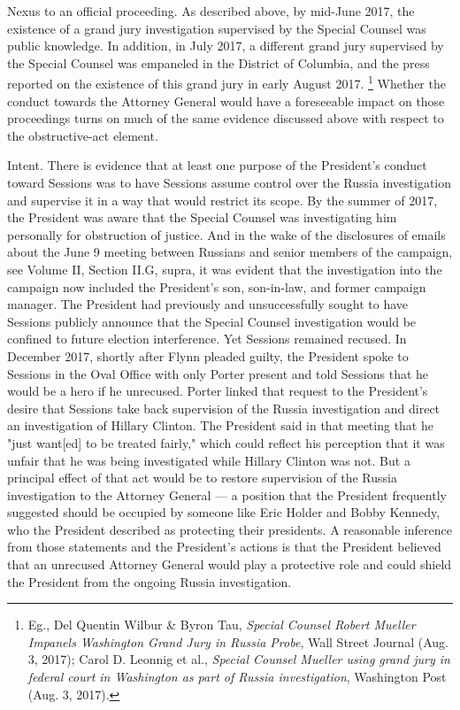 {Nexus to an official proceeding.
As described above, by mid-June 2017, the existence of a grand jury investigation supervised by the Special Counsel was public knowledge.
In addition, in July 2017, a different grand jury supervised by the Special Counsel was empaneled in the District of Columbia, and the press reported on the existence of this grand jury in early August 2017.%
\footnote{Eg., Del Quentin Wilbur \& Byron Tau, \textit{Special Counsel Robert Mueller Impanels Washington Grand Jury in Russia Probe}, Wall Street Journal (Aug. 3, 2017);
Carol D. Leonnig et al., \textit{Special Counsel Mueller using grand jury in federal court in Washington as part of Russia investigation}, Washington Post (Aug. 3, 2017).}
Whether the conduct towards the Attorney General would have a foreseeable impact on those proceedings turns on much of the same evidence discussed above with respect to the obstructive-act element.

Intent.
There is evidence that at least one purpose of the President's conduct toward Sessions was to have Sessions assume control over the Russia investigation and supervise it in a way that would restrict its scope.
By the summer of 2017, the President was aware that the Special Counsel was investigating him personally for obstruction of justice.
And in the wake of the disclosures of emails about the June 9 meeting between Russians and senior members of the campaign, see Volume II, Section II.G, supra, it was evident that the investigation into the campaign now included the President's son, son-in-law, and former campaign manager.
The President had previously and unsuccessfully sought to have Sessions publicly announce that the Special Counsel investigation would be confined to future election interference.
Yet Sessions remained recused.
In December 2017, shortly after Flynn pleaded guilty, the President spoke to Sessions in the Oval Office with only Porter present and told Sessions that he would be a hero if he unrecused.
Porter linked that request to the President's desire that Sessions take back supervision of the Russia investigation and direct an investigation of Hillary Clinton.
The President said in that meeting that he "just want[ed] to be treated fairly," which could reflect his perception that it was unfair that he was being investigated while Hillary Clinton was not.
But a principal effect of that act would be to restore supervision of the Russia investigation to the
Attorney General — a position that the President frequently suggested should be occupied by someone like Eric Holder and Bobby Kennedy, who the President described as protecting their presidents.
A reasonable inference from those statements and the President's actions is that the President believed that an unrecused Attorney General would play a protective role and could shield the President from the ongoing Russia investigation.

}
